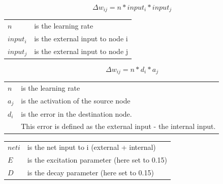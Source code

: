 {\newpage
\clearpage
\samepage \begin{displaymath}\Delta w_{ij} = n * input_i * input_j
\end{displaymath}
}

{\newpage
\clearpage
\samepage \begin{tabular}{ll}
  $n$           &is the learning rate\\ 
  $input_i$     &is the external input to node i\\ 
  $input_j$     &is the external input to node j\\ 
\end{tabular}
}

{\newpage
\clearpage
\samepage \begin{displaymath}\Delta w_{ij} = n * d_i * a_j
\end{displaymath}
}

{\newpage
\clearpage
\samepage \begin{tabular}{ll}
  $n$           &is the learning rate\\ 
  $a_j$         &is the activation of the source node\\ 
  $d_i$         &is the error in the destination node.\\ 
                &This error is defined as the external input - the
                internal input.\\ 
\end{tabular}
}

{\newpage
\clearpage
\samepage \begin{tabular}{ll}
  $neti$        &is the net input to i (external + internal)\\ 
  $E$           &is the excitation parameter (here set to 0.15)\\ 
  $D$           &is the decay parameter (here set to 0.15)\\ 
\end{tabular}
}

{\newpage
\clearpage
\samepage \begin{figure}[htbp]
 \begin{center}
  \begin{minipage}[htbp]{\textwidth}
  \end{minipage}
   
  \label{jordan_net}
 \end{center}
\end{figure}
}

